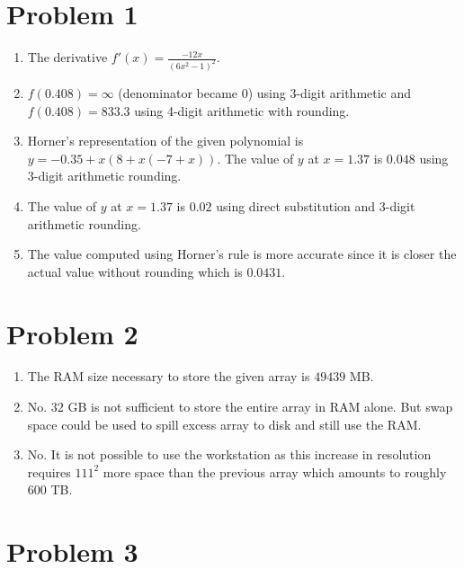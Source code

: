 \documentclass[12pt,letterpaper]{article}
\begin{document}
\section*{Problem 1}

\begin{enumerate}
  \item
   The derivative $f'(x) = \frac{-12x}{(6x^2-1)^2}$.
  \item
   $f(0.408) = \infty $ (denominator became $0$) using 3-digit arithmetic and $f(0.408) = 833.3$ using 4-digit arithmetic with rounding.
  \item
  Horner's representation of the given polynomial is $y = -0.35 + x(8 + x(-7 + x))$. The value of $y$ at $x=1.37$ is $0.048$ using 3-digit arithmetic rounding.
  \item 
  The value of $y$ at $x=1.37$ is $0.02$ using direct substitution and 3-digit arithmetic rounding.
  \item 
  The value computed using Horner's rule is more accurate since it is closer the actual value without rounding which is $0.0431$.  
\end{enumerate}


\section*{Problem 2}

\begin{enumerate}
	\item The RAM size necessary to store the given array is $49439$ MB.
	\item No. $32$ GB is not sufficient to store the entire array in RAM alone. But swap space could be used to spill excess array to disk and still use the RAM.
	\item No. It is not possible to use the workstation as this increase in resolution requires $111^2$ more space than the previous array which amounts to roughly $600$ TB.	
\end{enumerate}

\section*{Problem 3}
\end{document}
